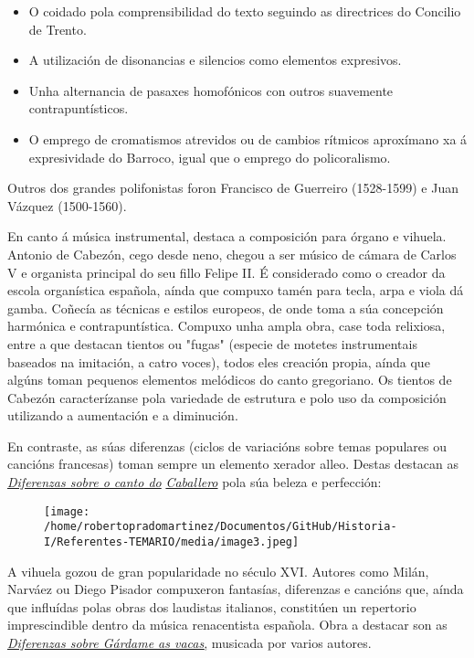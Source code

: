 \documentclass[
]{article}
\begin{document}
\begin{itemize}
\item
  O coidado pola comprensibilidad do texto seguindo as directrices do
  Concilio de Trento.
\item
  A utilización de disonancias e silencios como elementos expresivos.
\item
  Unha alternancia de pasaxes homofónicos con outros suavemente
  contrapuntísticos.
\item
  O emprego de cromatismos atrevidos ou de cambios rítmicos aproxímano
  xa á expresividade do Barroco, igual que o emprego do policoralismo.
\end{itemize}

Outros dos grandes polifonistas foron Francisco de Guerreiro (1528-1599)
e Juan Vázquez (1500-1560).

En canto á música instrumental, destaca a composición para órgano e
vihuela. Antonio de Cabezón, cego desde neno, chegou a ser músico de
cámara de Carlos V e organista principal do seu fillo Felipe II. É
considerado como o creador da escola organística española, aínda que
compuxo tamén para tecla, arpa e viola dá gamba. Coñecía as técnicas e
estilos europeos, de onde toma a súa concepción harmónica e
contrapuntística. Compuxo unha ampla obra, case toda relixiosa, entre a
que destacan tientos ou "fugas" (especie de motetes instrumentais
baseados na imitación, a catro voces), todos eles creación propia, aínda
que algúns toman pequenos elementos melódicos do canto gregoriano. Os
tientos de Cabezón caracterízanse pola variedade de estrutura e polo uso
da composición utilizando a aumentación e a diminución.

En contraste, as súas diferenzas (ciclos de variacións sobre temas
populares ou cancións francesas) toman sempre un elemento xerador alleo.
Destas destacan as
\href{http://open.spotify.com/track/3KIn5dZJbmc4bJ4aJpyGnl}{\emph{Diferenzas
sobre o canto do}}
\href{http://open.spotify.com/track/3KIn5dZJbmc4bJ4aJpyGnl}{\emph{Caballero}}
pola súa beleza e perfección:

\begin{figure}
\centering
\texttt{[image: /home/robertopradomartinez/Documentos/GitHub/Historia-I/Referentes-TEMARIO/media/image3.jpeg]}
\caption{}
\end{figure}

A vihuela gozou de gran popularidade no século XVI. Autores como Milán,
Narváez ou Diego Pisador compuxeron fantasías, diferenzas e cancións
que, aínda que influídas polas obras dos laudistas italianos, constitúen
un repertorio imprescindible dentro da música renacentista española.
Obra a destacar son as
\href{http://open.spotify.com/track/6NTeSGJjH5nL7FRHf0L09S}{\emph{Diferenzas
sobre Gárdame as vacas},} musicada por varios autores.
\end{document}
